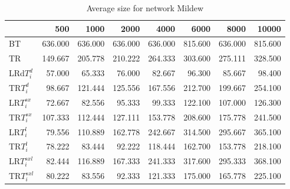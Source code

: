 \begin{table}
\begin{center}
\begin{tabular}{lrrrrrrr}
 & 500 &  1000 & 2000 & 4000 & 6000& 8000&  10000\\\hline
BT & 636.000 & 636.000 & 636.000 & 636.000 & 815.600 & 636.000 & 815.600\\\hline
TR & 149.667 & 205.778 & 210.222 & 264.333 & 303.600 & 275.111 & 328.500\\\hline
LRd$T_i^d$ & 57.000 & 65.333 & 76.000 & 82.667 & 96.300 & 85.667 & 98.400\\\hline
TR$T_i^d$ & 98.667 & 121.444 & 125.556 & 167.556 & 212.700 & 199.667 & 254.100\\\hline
LR$T_i^{sx}$ & 72.667 & 82.556 & 95.333 & 99.333 & 122.100 & 107.000 & 126.300\\\hline
TR$T_i^{sx}$ & 107.333 & 112.444 & 127.111 & 153.778 & 208.600 & 175.778 & 241.500\\\hline
LR$T_i^l$ & 79.556 & 110.889 & 162.778 & 242.667 & 314.500 & 295.667 & 365.100\\\hline
TR$T_i^l$ & 78.222 & 83.444 & 92.222 & 118.444 & 162.700 & 153.778 & 218.100\\\hline
LR$T_i^{sxl}$ & 82.444 & 116.889 & 167.333 & 241.333 & 317.600 & 295.333 & 368.100\\\hline
TR$T_i^{sxl}$ & 80.222 & 83.556 & 92.333 & 121.333 & 175.000 & 165.778 & 225.100\\\hline
\end{tabular}
\end{center}
\caption{Average size for network Mildew }
\label{Mildewsi}
\end{table}

